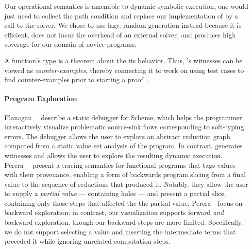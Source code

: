 Our operational semantics is amenable to dynamic-symbolic execution, one
would just need to collect the path condition and replace our
implementation of \gensym by a call to the solver. We chose to use lazy,
random generation instead because it is efficient, does not incur
the overhead of an external solver, and produces high coverage for our
domain of novice programs.

A function's type is a theorem about the its behavior.
Thus, \toolname's witnesses can be viewed as \emph{counter-examples},
thereby connecting it to work on using test cases to find
counter-examples prior to starting a proof~\cite{Chamarthi2011-fo,Seidel2015-pe}.


\paragraph{Program Exploration}

Flanagan~\etal~\citealt{Flanagan1996-bu} describe a static debugger for Scheme, which helps
the programmer interactively visualize problematic source-sink flows
corresponding to soft-typing errors. The debugger allows the user to explore
an abstract reduction graph computed from a static value set analysis of
the program. In contrast, \toolname generates witnesses and allows the user
to explore the resulting dynamic execution.
%
Perera~\etal~\citealt{Perera2012-dy} present a tracing semantics
for functional programs that tags values with their provenance, enabling
a form of backwards program slicing from a final value to the sequence
of reductions that produced it. Notably, they allow the user to supply a
\emph{partial value} --- containing holes --- and present a partial slice,
containing only those steps that affected the the partial value.
Perera~\etal\ focus on backward exploration; in contrast, our
visualization supports forward \emph{and} backward exploration, though
our backward steps are more limited.
%
Specifically, we do not support selecting a value and inserting the
intermediate terms that preceded it while ignoring unrelated computation
steps. %


